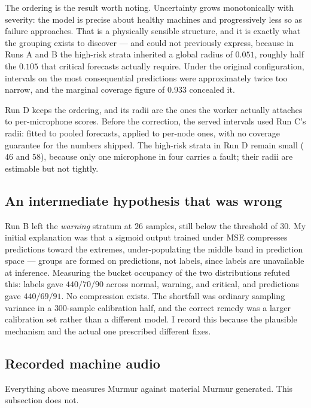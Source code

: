 \documentclass[11pt]{article}
\begin{document}
The ordering is the result worth noting. Uncertainty grows monotonically with
severity: the model is precise about healthy machines and progressively less so
as failure approaches. That is a physically sensible structure, and it is
exactly what the grouping exists to discover --- and could not previously
express, because in Runs A and B the high-risk strata inherited a global radius
of $0.051$, roughly half the $0.105$ that critical forecasts actually require.
Under the original configuration, intervals on the most consequential
predictions were approximately twice too narrow, and the marginal coverage
figure of $0.933$ concealed it.

Run D keeps the ordering, and its radii are the ones the worker actually
attaches to per-microphone scores. Before the correction, the served intervals
used Run C's radii: fitted to pooled forecasts, applied to per-node ones, with no
coverage guarantee for the numbers shipped. The high-risk strata in Run D remain
small ($46$ and $58$), because only one microphone in four carries a fault;
their radii are estimable but not tightly.

\subsection{An intermediate hypothesis that was wrong}

Run B left the \emph{warning} stratum at $26$ samples, still below the threshold
of $30$. My initial explanation was that a sigmoid output trained under MSE
compresses predictions toward the extremes, under-populating the middle band in
prediction space --- groups are formed on predictions, not labels, since labels
are unavailable at inference. Measuring the bucket occupancy of the two
distributions refuted this: labels gave $440/70/90$ across normal, warning, and
critical, and predictions gave $440/69/91$. No compression exists. The shortfall
was ordinary sampling variance in a $300$-sample calibration half, and the
correct remedy was a larger calibration set rather than a different model. I
record this because the plausible mechanism and the actual one prescribed
different fixes.

\subsection{Recorded machine audio}
\label{sec:dcase}

Everything above measures Murmur against material Murmur generated. This
subsection does not.
\end{document}
